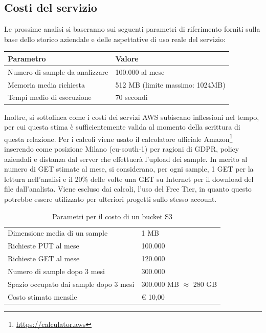 \subsection{Costi del servizio}
Le prossime analisi si baseranno sui seguenti parametri di riferimento forniti sulla base dello storico aziendale e delle aspettative di uso reale del servizio:
\begin{table}[H]
    \centering
    \begin{tabular}{|l|l|}
        \hline
        \textbf{Parametro}             & \textbf{Valore}                 \\ \hline
        Numero di sample da analizzare & 100.000 al mese                 \\
        Memoria media richiesta        & 512 MB (limite massimo: 1024MB) \\
        Tempi medio di esecuzione      & 70 secondi                      \\ \hline
    \end{tabular}
\end{table}

Inoltre, si sottolinea come i costi dei servizi AWS subiscano inflessioni nel tempo, per cui questa stima è sufficientemente valida al momento della scrittura di questa relazione.
Per i calcoli viene usato il calcolatore ufficiale Amazon\footnote{\url{https://calculator.aws}}
inserendo come posizione Milano (eu-south-1) per ragioni di GDPR, policy aziendali e distanza dal server che effettuerà l'upload dei sample. In merito al numero di GET stimate al mese, si considerano, per ogni sample, 1 GET per la lettura nell'analisi e il 20\% delle volte una GET su Internet per il download del file dall'analista.
Viene escluso dai calcoli, l'uso del Free Tier, in quanto questo potrebbe essere utilizzato per ulteriori progetti sullo stesso account.

\begin{table}[H]
\centering
\begin{tabular}{|l|l|}
\hline
Dimensione media di un sample          & 1 MB                \\
Richieste PUT al mese                  & 100.000             \\
Richieste GET al mese                  & 120.000             \\
Numero di sample dopo 3 mesi           & 300.000             \\
Spazio occupato dai sample dopo 3 mesi & 300.000 MB $\approx$ 280 GB \\ \hline
Costo stimato mensile                  & € 10,00             \\ \hline
\end{tabular}
\label{tab:aws_s3_costs}
\caption{Parametri per il costo di un bucket S3}
\end{table}

